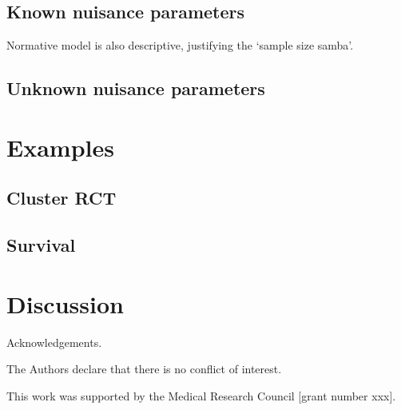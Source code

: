\documentclass[sagev]{sagej}
\begin{document}
\subsection{Known nuisance parameters}

Normative model is also descriptive, justifying the `sample size samba'.

\subsection{Unknown nuisance parameters}



\section{Examples}

\subsection{Cluster RCT}

\subsection{Survival}

\section{Discussion}

\begin{acks}
Acknowledgements.
\end{acks}

\begin{dci}
The Authors declare that there is no conflict of interest.
\end{dci}

\begin{funding}
This work was supported by the Medical Research Council [grant number xxx].
\end{funding}



\end{document}
